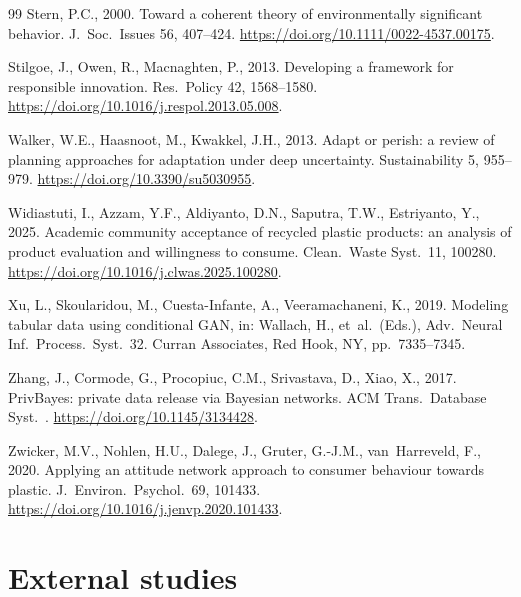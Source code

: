 \begin{thebibliography}{99}
Stern, P.C., 2000. Toward a coherent theory of environmentally significant behavior. J.\ Soc.\
Issues 56, 407--424. \url{https://doi.org/10.1111/0022-4537.00175}.

Stilgoe, J., Owen, R., Macnaghten, P., 2013. Developing a framework for responsible
innovation. Res.\ Policy 42, 1568--1580. \url{https://doi.org/10.1016/j.respol.2013.05.008}.

Walker, W.E., Haasnoot, M., Kwakkel, J.H., 2013. Adapt or perish: a review of planning
approaches for adaptation under deep uncertainty. Sustainability 5, 955--979.
\url{https://doi.org/10.3390/su5030955}.

Widiastuti, I., Azzam, Y.F., Aldiyanto, D.N., Saputra, T.W., Estriyanto, Y., 2025. Academic
community acceptance of recycled plastic products: an analysis of product evaluation and
willingness to consume. Clean.\ Waste Syst.\ 11, 100280.
\url{https://doi.org/10.1016/j.clwas.2025.100280}.

Xu, L., Skoularidou, M., Cuesta-Infante, A., Veeramachaneni, K., 2019. Modeling tabular data
using conditional GAN, in: Wallach, H., et~al.\ (Eds.), Adv.\ Neural Inf.\ Process.\ Syst.\
32. Curran Associates, Red Hook, NY, pp.\ 7335--7345.

Zhang, J., Cormode, G., Procopiuc, C.M., Srivastava, D., Xiao, X., 2017. PrivBayes: private
data release via Bayesian networks. ACM Trans.\ Database Syst.\ .
\url{https://doi.org/10.1145/3134428}.

Zwicker, M.V., Nohlen, H.U., Dalege, J., Gruter, G.-J.M., van~Harreveld, F., 2020. Applying
an attitude network approach to consumer behaviour towards plastic. J.\ Environ.\ Psychol.\
69, 101433. \url{https://doi.org/10.1016/j.jenvp.2020.101433}.

\end{thebibliography}

\appendix
\section{External studies}
\label{app:studies}

